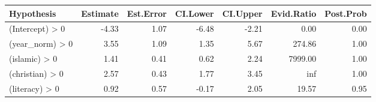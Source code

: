 \begin{tabular}{lrrrrrr}
\toprule
Hypothesis & Estimate & Est.Error & CI.Lower & CI.Upper & Evid.Ratio & Post.Prob \\
\midrule
(Intercept) > 0 & -4.33 & 1.07 & -6.48 & -2.21 & 0.00 & 0.00 \\
(year_norm) > 0 & 3.55 & 1.09 & 1.35 & 5.67 & 274.86 & 1.00 \\
(islamic) > 0 & 1.41 & 0.41 & 0.62 & 2.24 & 7999.00 & 1.00 \\
(christian) > 0 & 2.57 & 0.43 & 1.77 & 3.45 & inf & 1.00 \\
(literacy) > 0 & 0.92 & 0.57 & -0.17 & 2.05 & 19.57 & 0.95 \\
\bottomrule
\end{tabular}
